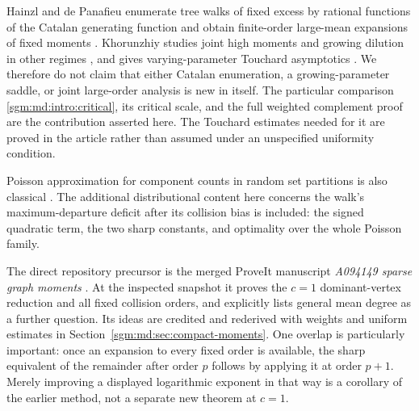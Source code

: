 \documentclass[11pt,letterpaper]{article}
\theoremstyle{remark}\newtheorem{remark}[theorem]{Remark}
\theoremstyle{definition}\newtheorem{definition}[theorem]{Definition}
\begin{document}
Hainzl and de Panafieu enumerate tree walks of fixed excess by rational
functions of the Catalan generating function and obtain finite-order
large-mean expansions of fixed moments \cite{hdp}. Khorunzhiy
studies joint high moments and growing dilution in other regimes
\cite{khor1}, and gives varying-parameter Touchard asymptotics
\cite{Khorunzhiy2020}. We therefore do not claim that either Catalan
enumeration, a growing-parameter saddle, or joint large-order analysis
is new in itself. The particular comparison \eqref{sgm:md:intro:critical},
its critical scale, and the full weighted complement proof are the
contribution asserted here. The Touchard estimates needed for it are
proved in the article rather than assumed under an unspecified
uniformity condition.

Poisson approximation for component counts in random set partitions
is also classical \cite{Pittel1997}. The additional distributional
content here concerns the walk's maximum-departure deficit after its
collision bias is included: the signed quadratic term, the two sharp
constants, and optimality over the whole Poisson family.

The direct repository precursor is the merged ProveIt manuscript
\emph{A094149 sparse graph moments} \cite{ProveIt2026}. At the inspected
snapshot it proves the $c=1$ dominant-vertex reduction and all fixed
collision orders, and explicitly lists general mean degree as a
further question. Its ideas are credited and rederived with weights
and uniform estimates in Section~\ref{sgm:md:sec:compact-moments}.
One overlap is particularly important: once an expansion to every
fixed order is available, the sharp equivalent of the remainder after
order $p$ follows by applying it at order $p+1$. Merely improving a
displayed logarithmic exponent in that way is a corollary of the
earlier method, not a separate new theorem at $c=1$.
\end{document}
